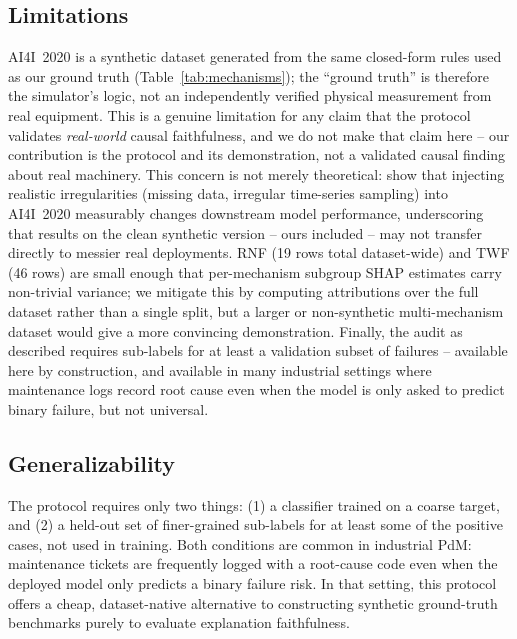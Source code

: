 \documentclass[11pt]{article}
\begin{document}
\subsection{Limitations}
\label{sec:limitations}
AI4I~2020 is a synthetic dataset generated from the same closed-form rules used as our ground truth
(Table~\ref{tab:mechanisms}); the ``ground truth'' is therefore the simulator's logic, not an
independently verified physical measurement from real equipment. This is a genuine limitation for
any claim that the protocol validates \emph{real-world} causal faithfulness, and we do not make that
claim here -- our contribution is the protocol and its demonstration, not a validated causal
finding about real machinery. This concern is not merely theoretical: \citet{autran2024ai4ipmdi}
show that injecting realistic irregularities (missing data, irregular time-series sampling) into
AI4I~2020 measurably changes downstream model performance, underscoring that results on the clean
synthetic version -- ours included -- may not transfer directly to messier real deployments. RNF
(19 rows total dataset-wide) and TWF (46 rows) are small enough
that per-mechanism subgroup SHAP estimates carry non-trivial variance; we mitigate this by computing
attributions over the full dataset rather than a single split, but a larger or non-synthetic
multi-mechanism dataset would give a more convincing demonstration. Finally, the audit as described
requires sub-labels for at least a validation subset of failures -- available here by construction,
and available in many industrial settings where maintenance logs record root cause even when the
model is only asked to predict binary failure, but not universal.

\subsection{Generalizability}
The protocol requires only two things: (1) a classifier trained on a coarse target, and (2) a
held-out set of finer-grained sub-labels for at least some of the positive cases, not used in
training. Both conditions are common in industrial PdM: maintenance tickets are frequently logged
with a root-cause code even when the deployed model only predicts a binary failure risk. In that
setting, this protocol offers a cheap, dataset-native alternative to constructing synthetic
ground-truth benchmarks purely to evaluate explanation faithfulness.
\end{document}
